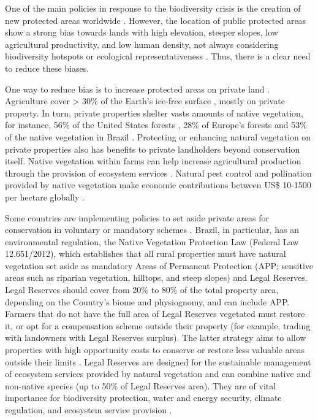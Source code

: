 \documentclass[
	12pt,				%
	oneside,			%
	a4paper,			%
	chapter=TITLE,		%
	section=TITLE,		%
	brazil,			%
	english				%
	]{abntex2}
\begin{document}
One of the main policies in response to the biodiversity crisis \autocite{cardinale_biodiversity_2012,ipbes_unedited_2019} is the creation of new protected areas worldwide \autocite{unep-wcmc_protected_2018}. However, the location of public protected areas show a strong bias towards lands with high elevation, steeper slopes, low agricultural productivity, and low human density, not always considering biodiversity hotspots or ecological representativeness \autocite{venter_bias_2018,watson_performance_2014}. Thus, there is a clear need to reduce these biases.

One way to reduce bias is to increase protected areas on private land \autocite{cortes_capano_emergence_2019,drescher_practice_2018}. Agriculture cover \textgreater{} 30\% of the Earth's ice-free surface \autocite{ellis_anthropogenic_2010}, mostly on private property. In turn, private properties shelter vasts amounts of native vegetation, for instance, 56\% of the United States forests \autocite{sass_forest_2017}, 28\% of Europe's forests \autocite{pulla_mapping_2013} and 53\% of the native vegetation in Brazil \autocite{freitas_who_2017}. Protecting or enhancing natural vegetation on private properties also has benefits to private landholders beyond conservation itself. Native vegetation within farms can help increase agricultural production through the provision of ecosystem services \autocite{dainese_global_2019}. Natural pest control and pollination provided by native vegetation \autocite{boesing_effects_2017,potts_safeguarding_2016,rand_spillover_2006} make economic contributions between US\$ 10-1500 per hectare globally \autocite{lautenbach_spatial_2012,naranjo_economic_2015,pimentel_economic_1997}.

Some countries are implementing policies to set aside private areas for conservation in voluntary or mandatory schemes \autocite{garibaldi_positive_2019}. Brazil, in particular, has an environmental regulation, the Native Vegetation Protection Law (Federal Law 12.651/2012), which establishes that all rural properties must have natural vegetation set aside as mandatory Areas of Permanent Protection (APP; sensitive areas such as riparian vegetation, hilltops, and steep slopes) and Legal Reserves. Legal Reserves should cover from 20\% to 80\% of the total property area, depending on the Country's biome and physiognomy, and can include APP. Farmers that do not have the full area of Legal Reserves vegetated must restore it, or opt for a compensation scheme outside their property (for example, trading with landowners with Legal Reserves surplus). The latter strategy aims to allow properties with high opportunity costs to conserve or restore less valuable areas outside their limits \autocite{may_environmental_2015}. Legal Reserves are designed for the sustainable management of ecosystem services provided by natural vegetation and can combine native and non-native species (up to 50\% of Legal Reserves area). They are of vital importance for biodiversity protection, water and energy security, climate regulation, and ecosystem service provision \autocite{metzger_why_2019}.
\end{document}
